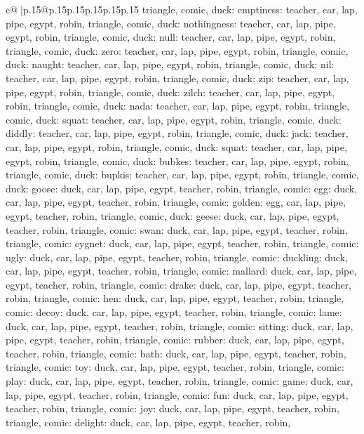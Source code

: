 \documentclass{article}
\begin{document}
{\begin{supertabular}{c@{$\;$}|p{.15\linewidth}@{}p{.15\linewidth}p{.15\linewidth}p{.15\linewidth}p{.15\linewidth}p{.15\linewidth}}
{{{triangle, comic, duck\n\nCLUE: emptiness\nTARGETS: teacher, car, lap, pipe, egypt, robin, triangle, comic, duck\n\nCLUE: nothingness\nTARGETS: teacher, car, lap, pipe, egypt, robin, triangle, comic, duck\n\nCLUE: null\nTARGETS: teacher, car, lap, pipe, egypt, robin, triangle, comic, duck\n\nCLUE: zero\nTARGETS: teacher, car, lap, pipe, egypt, robin, triangle, comic, duck\n\nCLUE: naught\nTARGETS: teacher, car, lap, pipe, egypt, robin, triangle, comic, duck\n\nCLUE: nil\nTARGETS: teacher, car, lap, pipe, egypt, robin, triangle, comic, duck\n\nCLUE: zip\nTARGETS: teacher, car, lap, pipe, egypt, robin, triangle, comic, duck\n\nCLUE: zilch\nTARGETS: teacher, car, lap, pipe, egypt, robin, triangle, comic, duck\n\nCLUE: nada\nTARGETS: teacher, car, lap, pipe, egypt, robin, triangle, comic, duck\n\nCLUE: squat\nTARGETS: teacher, car, lap, pipe, egypt, robin, triangle, comic, duck\n\nCLUE: diddly\nTARGETS: teacher, car, lap, pipe, egypt, robin, triangle, comic, duck\n\nCLUE: jack\nTARGETS: teacher, car, lap, pipe, egypt, robin, triangle, comic, duck\n\nCLUE: squat\nTARGETS: teacher, car, lap, pipe, egypt, robin, triangle, comic, duck\n\nCLUE: bubkes\nTARGETS: teacher, car, lap, pipe, egypt, robin, triangle, comic, duck\n\nCLUE: bupkis\nTARGETS: teacher, car, lap, pipe, egypt, robin, triangle, comic, duck\n\nCLUE: goose\nTARGETS: duck, car, lap, pipe, egypt, teacher, robin, triangle, comic\n\nCLUE: egg\nTARGETS: duck, car, lap, pipe, egypt, teacher, robin, triangle, comic\n\nCLUE: golden\nTARGETS: egg, car, lap, pipe, egypt, teacher, robin, triangle, comic, duck\n\nCLUE: geese\nTARGETS: duck, car, lap, pipe, egypt, teacher, robin, triangle, comic\n\nCLUE: swan\nTARGETS: duck, car, lap, pipe, egypt, teacher, robin, triangle, comic\n\nCLUE: cygnet\nTARGETS: duck, car, lap, pipe, egypt, teacher, robin, triangle, comic\n\nCLUE: ugly\nTARGETS: duck, car, lap, pipe, egypt, teacher, robin, triangle, comic\n\nCLUE: duckling\nTARGETS: duck, car, lap, pipe, egypt, teacher, robin, triangle, comic\n\nCLUE: mallard\nTARGETS: duck, car, lap, pipe, egypt, teacher, robin, triangle, comic\n\nCLUE: drake\nTARGETS: duck, car, lap, pipe, egypt, teacher, robin, triangle, comic\n\nCLUE: hen\nTARGETS: duck, car, lap, pipe, egypt, teacher, robin, triangle, comic\n\nCLUE: decoy\nTARGETS: duck, car, lap, pipe, egypt, teacher, robin, triangle, comic\n\nCLUE: lame\nTARGETS: duck, car, lap, pipe, egypt, teacher, robin, triangle, comic\n\nCLUE: sitting\nTARGETS: duck, car, lap, pipe, egypt, teacher, robin, triangle, comic\n\nCLUE: rubber\nTARGETS: duck, car, lap, pipe, egypt, teacher, robin, triangle, comic\n\nCLUE: bath\nTARGETS: duck, car, lap, pipe, egypt, teacher, robin, triangle, comic\n\nCLUE: toy\nTARGETS: duck, car, lap, pipe, egypt, teacher, robin, triangle, comic\n\nCLUE: play\nTARGETS: duck, car, lap, pipe, egypt, teacher, robin, triangle, comic\n\nCLUE: game\nTARGETS: duck, car, lap, pipe, egypt, teacher, robin, triangle, comic\n\nCLUE: fun\nTARGETS: duck, car, lap, pipe, egypt, teacher, robin, triangle, comic\n\nCLUE: joy\nTARGETS: duck, car, lap, pipe, egypt, teacher, robin, triangle, comic\n\nCLUE: delight\nTARGETS: duck, car, lap, pipe, egypt, teacher, robin, }}}
\end{supertabular}}
\end{document}
